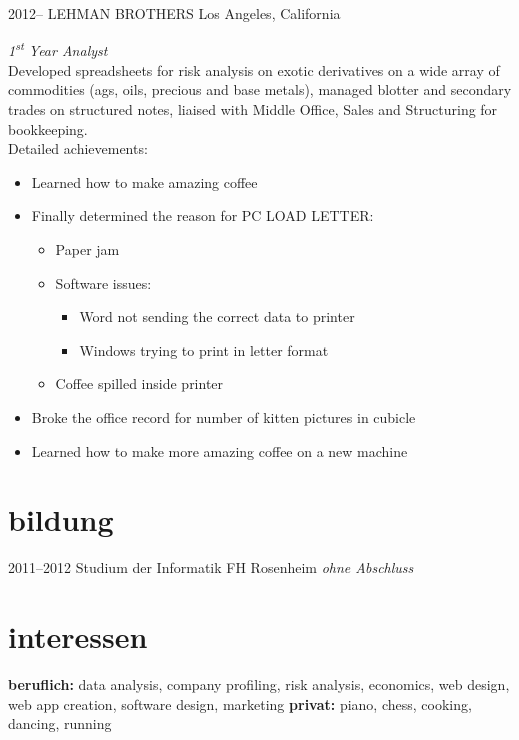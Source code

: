 \documentclass[]{friggeri-cv-a4}
\begin{document}
\begin{entrylist}

\entry
{2012--}
{LEHMAN BROTHERS}
{Los Angeles, California}
{\emph{1\textsuperscript{st} Year Analyst} \\
Developed spreadsheets for risk analysis on exotic derivatives on a wide array of commodities (ags, oils, precious and base metals), managed blotter and secondary trades on structured notes, liaised with Middle Office, Sales and Structuring for bookkeeping. \\
Detailed achievements:
\begin{itemize}
\item Learned how to make amazing coffee
\item Finally determined the reason for \textsc{PC LOAD LETTER}:
\begin{itemize}
\item Paper jam
\item Software issues:
\begin{itemize}
\item Word not sending the correct data to printer
\item Windows trying to print in letter format
\end{itemize}
\item Coffee spilled inside printer
\end{itemize}
\item Broke the office record for number of kitten pictures in cubicle
\item Learned how to make more amazing coffee on a new machine
\end{itemize}}
\end{entrylist}


\section{bildung}
\begin{entrylist}
\entry
{2011--2012}
{Studium der Informatik}
{FH Rosenheim}
{\textit{ohne Abschluss}}
\end{entrylist}



\section{interessen}

\textbf{beruflich:} data analysis, company profiling, risk analysis, economics, web design, web app creation, software design, marketing \textbf{privat:} piano, chess, cooking, dancing, running

\end{document}
